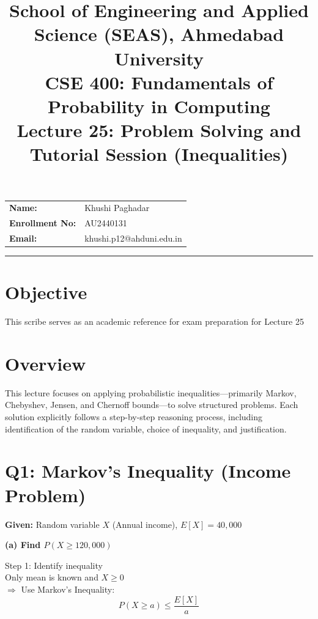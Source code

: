 \documentclass[11pt]{article}
\title{
\normalsize School of Engineering and Applied Science (SEAS), Ahmedabad University \\
\vspace{0.2cm}
\textbf{CSE 400: Fundamentals of Probability in Computing}\\
\Large Lecture 25: Problem Solving and Tutorial Session (Inequalities)
}
\author{}
\date{}
\begin{document}
\maketitle
\vspace{-2cm}

\begin{center}
\begin{tabular}{ll}
\textbf{Name:} & {Khushi Paghadar \hspace{2.5in}} \\
\textbf{Enrollment No:} & {AU2440131 \hspace{2.5in}} \\
\textbf{Email:} & {khushi.p12@ahduni.edu.in \hspace{2.1in}} \\
\end{tabular}
\end{center}

\hrule
\vspace{0.5cm}

\section*{Objective}
This scribe serves as an academic reference for exam preparation for Lecture 25

\section*{Overview}
This lecture focuses on applying probabilistic inequalities—primarily Markov, Chebyshev, Jensen, and Chernoff bounds—to solve structured problems. Each solution explicitly follows a step-by-step reasoning process, including identification of the random variable, choice of inequality, and justification.

\vspace{0.5cm}

\section*{Q1: Markov’s Inequality (Income Problem)}

\textbf{Given:} Random variable $X$ (Annual income), $E[X] = 40{,}000$

\textbf{(a) Find $P(X \ge 120{,}000)$}

Step 1: Identify inequality \\
Only mean is known and $X \ge 0$ \\
$\Rightarrow$ Use Markov’s Inequality:
\[
P(X \ge a) \le \frac{E[X]}{a}
\]
\end{document}
